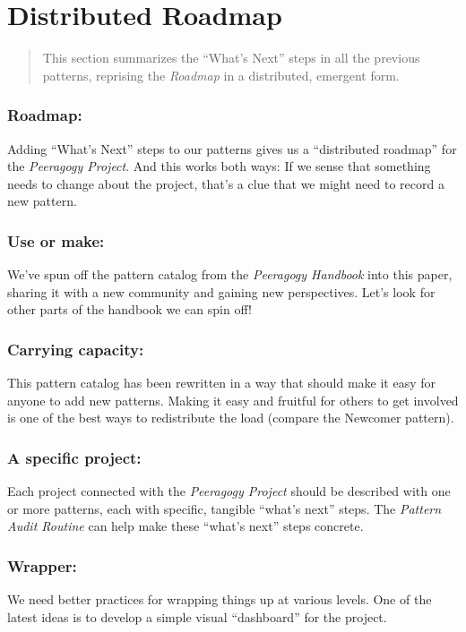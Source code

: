 \section{Distributed Roadmap} \label{sec:Distributed_Roadmap}

\begin{quote}
This section summarizes the ``What's Next'' steps in all the previous
patterns, reprising the \emph{Roadmap} in a distributed, emergent form.
\end{quote}

\subsubsection*{Roadmap:} Adding ``What's Next'' steps to our patterns gives us a ``distributed roadmap'' for the \emph{Peeragogy Project}.  And this works both ways:  
If we sense that something needs to change about the project, that's a
clue that we might need to record a new pattern.

\subsubsection*{Use or make:} 
We've spun off the pattern catalog from the \emph{Peeragogy Handbook} into this paper, sharing it with a new community and gaining new perspectives.  Let's look for other parts of the handbook we can spin off!

\subsubsection*{Carrying capacity:} This pattern catalog has been rewritten in a way that should make it
easy for anyone to add new patterns. Making it easy and fruitful for
others to get involved is one of the best ways to redistribute the load
(compare the Newcomer pattern).

\subsubsection*{A specific project:} 
 Each project connected with the \emph{Peeragogy Project} should be described with one or more patterns, each with specific, tangible ``what's next'' steps.  The \emph{Pattern Audit Routine} can help make these ``what's next'' steps concrete.

\subsubsection*{Wrapper:}  We need better practices for wrapping things up at
various levels.  One of the latest ideas is to develop a simple visual
``dashboard'' for the project.

